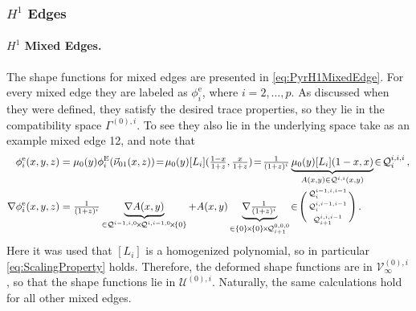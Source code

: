 \subsubsection {\texorpdfstring{$H^1$}{H1} Edges}

\paragraph{\texorpdfstring{$H^1$}{H1} Mixed Edges.}
The shape functions for mixed edges are presented in \eqref{eq:PyrH1MixedEdge}.
For every mixed edge they are labeled as $\phi_i^\mathrm{e}$, where $i=2,\ldots,p$.
As discussed when they were defined, they satisfy the desired trace properties, so they lie in the compatibility space $\Gamma^{(0),i}$.
To see they also lie in the underlying space take as an example mixed edge 12, and note that
\begin{equation}
\begin{aligned}
	\phi_i^\mathrm{e}(x,y,z)&=\mu_0(y)\phi_i^\E(\vec{\nu}_{01}(x,z))
		\!=\!\mu_0(y)[L_i](\textstyle{\frac{1-x}{1+z}},\textstyle{\frac{x}{1+z}})
			\!=\!\textstyle{\frac{1}{(1+z)^i}}\underbrace{\mu_0(y)[L_i](1-x,x)}_{A(x,y)\in\mathcal{Q}^{i,i}(x,y)}
				\!\in\!\mathcal{Q}_i^{i,i,i}\,,\\
	\nabla\phi_i^\mathrm{e}(x,y,z)&=
		\textstyle{\frac{1}{(1+z)^i}}\underbrace{\nabla A(x,y)}_{\in\mathcal{Q}^{i-1,i,0}\!\times\!\mathcal{Q}^{i,i-1,0}\!\times\!\{0\}}
			+A(x,y)\underbrace{\nabla\textstyle{\frac{1}{(1+z)^i}}}_{\in\{0\}\!\times\!\{0\}\!\times\!\mathcal{Q}_{i+1}^{0,0,0}}
				\!\in\!\Bigg(\begin{smallmatrix}\mathcal{Q}_i^{i-1,i,i-1}\\[2pt]\mathcal{Q}_i^{i,i-1,i-1}\\[2pt]	
					\mathcal{Q}_{i+1}^{i,i,i-1}\end{smallmatrix}\Bigg)\,.
\end{aligned}
\end{equation}
Here it was used that $[L_i]$ is a homogenized polynomial, so in particular \eqref{eq:ScalingProperty} holds.
Therefore, the deformed shape functions are in $\mathcal{V}_\infty^{(0),i}$, so that the shape functions lie in $\mathcal{U}^{(0),i}$.
Naturally, the same calculations hold for all other mixed edges.

